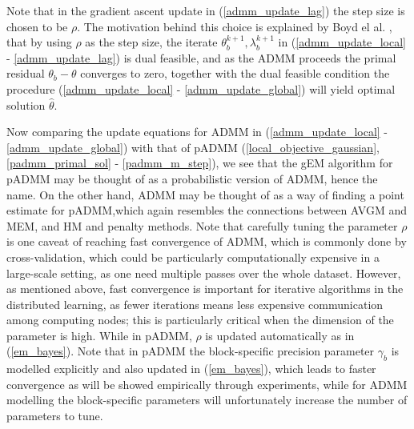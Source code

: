 \documentclass{article}
\newcommand{\1}[0]{\ensuremath{\boldsymbol{1}}\xspace}
\begin{document}
Note that in the gradient ascent update in (\ref{admm_update_lag}) the step size is chosen to be $\rho$. The motivation behind this choice is explained by Boyd el al. , that by using $\rho$ as the step size, the iterate
$\theta_b^{k+1}, \lambda_b^{k+1}$ in (\ref{admm_update_local} - \ref{admm_update_lag}) is dual feasible, and as the ADMM proceeds the primal residual $\theta_b -\theta$ converges to zero, together with the dual feasible condition the procedure (\ref{admm_update_local} - \ref{admm_update_global}) will yield optimal solution $\hat\theta$. 

Now comparing the update equations for ADMM in (\ref{admm_update_local} - \ref{admm_update_global}) with that of pADMM (\ref{local_objective_gaussian}, \ref{padmm_primal_sol} - \ref{padmm_m_step}), we see that the gEM algorithm for pADMM may be thought of as a probabilistic version of ADMM, hence the name. On the other hand, ADMM may be thought of as a way of finding a point estimate for pADMM,which again resembles the connections between AVGM and MEM, and HM and penalty methods. Note that carefully tuning the parameter $\rho$ is one caveat of reaching fast convergence of ADMM, which is commonly done by cross-validation, which could be particularly computationally expensive in a large-scale setting, as one need multiple passes over the whole dataset. However, as mentioned above, fast convergence is important for iterative algorithms in the distributed learning, as fewer iterations means less expensive communication among computing nodes; this is particularly critical when the dimension of the parameter is high. While in pADMM, $\rho$ is updated automatically as in (\ref{em_bayes}). Note that in pADMM the block-specific precision parameter $\gamma_b$ is modelled explicitly and also updated in (\ref{em_bayes}), which leads to faster convergence as will be showed empirically through experiments, while for ADMM modelling the block-specific parameters will unfortunately increase the number of parameters to tune.
\end{document}
